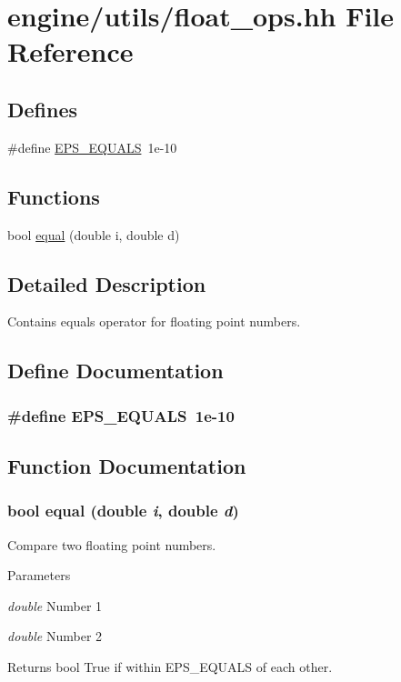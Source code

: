 \hypertarget{float__ops_8hh}{
\section{engine/utils/float\_\-ops.hh File Reference}
\label{float__ops_8hh}
}
\subsection*{Defines}
\begin{DoxyCompactItemize}
\item 
\#define \hyperlink{float__ops_8hh_a7de1a0565f18d8928e67e766d8153dde}{EPS\_\-EQUALS}~1e-\/10
\end{DoxyCompactItemize}
\subsection*{Functions}
\begin{DoxyCompactItemize}
\item 
bool \hyperlink{float__ops_8hh_a72c9a86e269a1daaa26cf4869fc21f99}{equal} (double i, double d)
\end{DoxyCompactItemize}


\subsection{Detailed Description}
Contains equals operator for floating point numbers. 

\subsection{Define Documentation}
\hypertarget{float__ops_8hh_a7de1a0565f18d8928e67e766d8153dde}{
\subsubsection[{EPS\_\-EQUALS}]{\setlength{\rightskip}{0pt plus 5cm}\#define EPS\_\-EQUALS~1e-\/10}}
\label{float__ops_8hh_a7de1a0565f18d8928e67e766d8153dde}


\subsection{Function Documentation}
\hypertarget{float__ops_8hh_a72c9a86e269a1daaa26cf4869fc21f99}{
\subsubsection[{equal}]{\setlength{\rightskip}{0pt plus 5cm}bool equal (double {\em i}, \/  double {\em d})}}
\label{float__ops_8hh_a72c9a86e269a1daaa26cf4869fc21f99}
Compare two floating point numbers.


\begin{DoxyParams}{Parameters}
\item[{\em double}]Number 1 \item[{\em double}]Number 2 \end{DoxyParams}
\begin{DoxyReturn}{Returns}
bool True if within EPS\_\-EQUALS of each other. 
\end{DoxyReturn}
